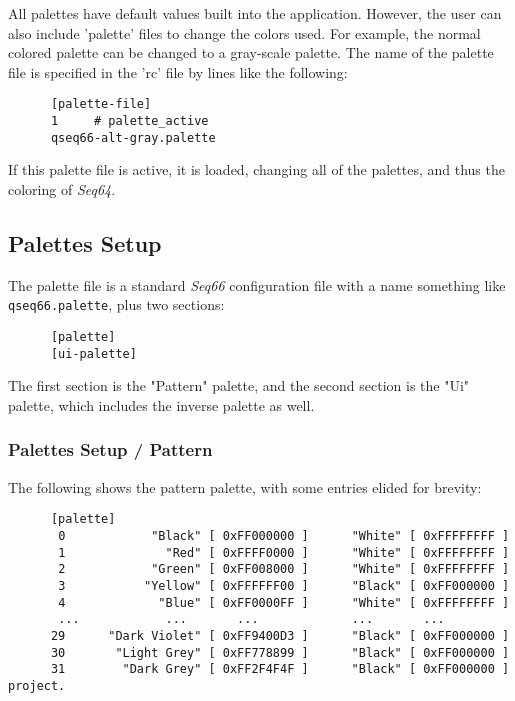    All palettes have default values built into the application.  However, the
   user can also include 'palette' files to change the colors used.  For
   example, the normal colored palette can be changed to a gray-scale palette.
   The name of the palette file is specified in the 'rc' file by lines like the
   following:

   \begin{verbatim}
      [palette-file]
      1     # palette_active
      qseq66-alt-gray.palette
   \end{verbatim}

   If this palette file is active, it is loaded, changing all of the palettes,
   and thus the coloring of \textsl{Seq64}.

\subsection{Palettes Setup}
\label{subsec:palettes_setup}

   The palette file is a standard \textsl{Seq66} configuration file with a name
   something like \texttt{qseq66.palette}, plus two sections:

   \begin{verbatim}
      [palette]
      [ui-palette]
   \end{verbatim}

   The first section is the "Pattern" palette, and the second section is the
   "Ui" palette, which includes the inverse palette as well.

\subsubsection{Palettes Setup / Pattern}
\label{subsubsec:palettes_setup_pattern}

   The following shows the pattern palette, with some entries elided for
   brevity:

   \begin{verbatim}
      [palette]
       0            "Black" [ 0xFF000000 ]      "White" [ 0xFFFFFFFF ]
       1              "Red" [ 0xFFFF0000 ]      "White" [ 0xFFFFFFFF ]
       2            "Green" [ 0xFF008000 ]      "White" [ 0xFFFFFFFF ]
       3           "Yellow" [ 0xFFFFFF00 ]      "Black" [ 0xFF000000 ]
       4             "Blue" [ 0xFF0000FF ]      "White" [ 0xFFFFFFFF ]
       ...            ...       ...             ...       ...
      29      "Dark Violet" [ 0xFF9400D3 ]      "Black" [ 0xFF000000 ]
      30       "Light Grey" [ 0xFF778899 ]      "Black" [ 0xFF000000 ]
      31        "Dark Grey" [ 0xFF2F4F4F ]      "Black" [ 0xFF000000 ]
project.
   \end{verbatim}

